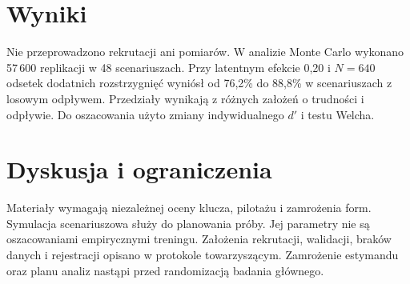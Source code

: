 \documentclass[11pt,a4paper]{article}
\begin{document}
\section{Wyniki}
Nie przeprowadzono rekrutacji ani pomiarów. W analizie Monte Carlo wykonano 57\,600 replikacji w 48 scenariuszach. Przy latentnym efekcie 0,20 i $N=640$ odsetek dodatnich rozstrzygnięć wyniósł od 76,2\% do 88,8\% w scenariuszach z losowym odpływem. Przedziały wynikają z różnych założeń o trudności i odpływie. Do oszacowania użyto zmiany indywidualnego $d'$ i testu Welcha.

\section{Dyskusja i ograniczenia}
Materiały wymagają niezależnej oceny klucza, pilotażu i zamrożenia form. Symulacja scenariuszowa służy do planowania próby. Jej parametry nie są oszacowaniami empirycznymi treningu. Założenia rekrutacji, walidacji, braków danych i rejestracji opisano w protokole towarzyszącym. Zamrożenie estymandu oraz planu analiz nastąpi przed randomizacją badania głównego.


\end{document}

